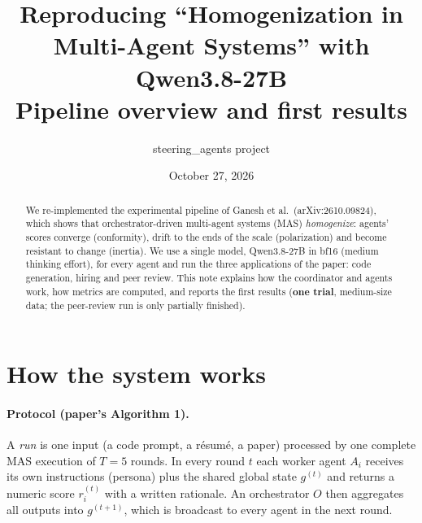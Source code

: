 \documentclass[11pt]{article}
\title{Reproducing ``Homogenization in Multi-Agent Systems'' with Qwen3.8-27B\\\large Pipeline overview and first results}
\author{steering\_agents project}
\date{October 27, 2026}
\begin{document}
\maketitle

\begin{abstract}
We re-implemented the experimental pipeline of Ganesh et al.\ (arXiv:2610.09824), which shows that orchestrator-driven multi-agent systems (MAS) \emph{homogenize}: agents' scores converge (conformity), drift to the ends of the scale (polarization) and become resistant to change (inertia). We use a single model, Qwen3.8-27B in bf16 (medium thinking effort), for every agent and run the three applications of the paper: code generation, hiring and peer review. This note explains how the coordinator and agents work, how metrics are computed, and reports the first results (\textbf{one trial}, medium-size data; the peer-review run is only partially finished).
\end{abstract}

\section{How the system works}

\paragraph{Protocol (paper's Algorithm 1).} A \emph{run} is one input (a code prompt, a r\'esum\'e, a paper) processed by one complete MAS execution of $T=5$ rounds. In every round $t$ each worker agent $A_i$ receives its own instructions (persona) plus the shared global state $g^{(t)}$ and returns a numeric score $r_i^{(t)}$ with a written rationale. An orchestrator $O$ then aggregates all outputs into $g^{(t+1)}$, which is broadcast to every agent in the next round.
\end{document}
